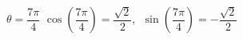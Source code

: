 {$\theta = \dfrac{7\pi}{4}$}
{$\cos \left(\dfrac{7\pi}{4} \right) = \dfrac{\sqrt{2}}{2}$, $\; \sin \left(\dfrac{7\pi}{4} \right) = -\dfrac{\sqrt{2}}{2}$}
